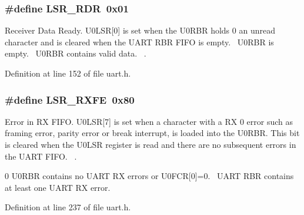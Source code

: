 \subsubsection[{\texorpdfstring{L\+S\+R\+\_\+\+R\+DR}{LSR_RDR}}]{\setlength{\rightskip}{0pt plus 5cm}\#define L\+S\+R\+\_\+\+R\+DR~0x01}\hypertarget{group___r_e_g_i_s_t_r_o___l_s_r_ga9e3adac29ef2f5d2cf60c4cebe971de9}{}\label{group___r_e_g_i_s_t_r_o___l_s_r_ga9e3adac29ef2f5d2cf60c4cebe971de9}


Receiver Data Ready. U0\+L\+SR\mbox{[}0\mbox{]} is set when the U0\+R\+BR holds 0 an unread character and is cleared when the U\+A\+RT R\+BR F\+I\+FO is empty.~ U0\+R\+BR is empty.~ U0\+R\+BR contains valid data.~\newline
. 



Definition at line 152 of file uart.\+h.

\subsubsection[{\texorpdfstring{L\+S\+R\+\_\+\+R\+X\+FE}{LSR_RXFE}}]{\setlength{\rightskip}{0pt plus 5cm}\#define L\+S\+R\+\_\+\+R\+X\+FE~0x80}\hypertarget{group___r_e_g_i_s_t_r_o___l_s_r_gad481ff8993ac05c71d4ca3b611833df0}{}\label{group___r_e_g_i_s_t_r_o___l_s_r_gad481ff8993ac05c71d4ca3b611833df0}


Error in RX F\+I\+FO. U0\+L\+SR\mbox{[}7\mbox{]} is set when a character with a RX 0 error such as framing error, parity error or break interrupt, is loaded into the U0\+R\+BR. This bit is cleared when the U0\+L\+SR register is read and there are no subsequent errors in the U\+A\+RT F\+I\+FO.~\newline
. 

0 U0\+R\+BR contains no U\+A\+RT RX errors or U0\+F\+CR\mbox{[}0\mbox{]}=0.~ U\+A\+RT R\+BR contains at least one U\+A\+RT RX error.~\newline


Definition at line 237 of file uart.\+h.

